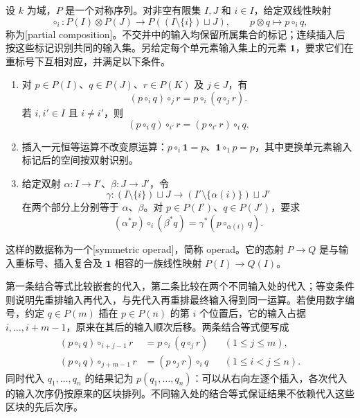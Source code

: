 \begin{definition}\label{b4:def:symmetric-operad}
	设 \(k\) 为域，\(P\) 是一个对称序列。对非空有限集 \(I,J\) 和 \(i\in I\)，给定双线性映射
	\[
		\circ_i:P(I)\otimes P(J)\longrightarrow P((I\setminus\{i\})\sqcup J),
		\qquad p\otimes q\longmapsto p\circ_i q,
	\]
	称为[partial composition]。不交并中的输入均保留所属集合的标记；连续插入后按这些标记识别共同的输入集。另给定每个单元素输入集上的元素 \(\mathbf1\)，要求它们在重标号下互相对应，并满足以下条件。
	\begin{enumerate}
		\item 对 \(p\in P(I)\)、\(q\in P(J)\)、\(r\in P(K)\) 及 \(j\in J\)，有
		\[
			(p\circ_i q)\circ_j r=p\circ_i(q\circ_j r).
		\]
		若 \(i,i'\in I\) 且 \(i\ne i'\)，则
		\[
			(p\circ_i q)\circ_{i'}r=(p\circ_{i'}r)\circ_i q.
		\]
		\item 插入一元恒等运算不改变原运算：\(p\circ_i\mathbf1=p\)、\(\mathbf1\circ_1p=p\)，其中更换单元素输入标记后的空间按双射识别。
		\item 给定双射 \(\alpha:I\rightarrow I'\)、\(\beta:J\rightarrow J'\)，令
		\[
			\gamma:(I\setminus\{i\})\sqcup J\longrightarrow (I'\setminus\{\alpha(i)\})\sqcup J'
		\]
		在两个部分上分别等于 \(\alpha\)、\(\beta\)。对 \(p\in P(I')\)、\(q\in P(J')\)，要求
		\[
			(\alpha^*p)\circ_i(\beta^*q)=\gamma^*(p\circ_{\alpha(i)}q).
		\]
	\end{enumerate}
	这样的数据称为一个[symmetric operad]，简称 operad。它的态射 \(P\rightarrow Q\) 是与输入重标号、插入复合及 \(\mathbf1\) 相容的一族线性映射 \(P(I)\rightarrow Q(I)\)。
\end{definition}

第一条结合等式比较嵌套的代入，第二条比较在两个不同输入处的代入；等变条件则说明先重排输入再代入，与先代入再重排最终输入得到同一运算。若使用数字编号，约定 \(q\in P(m)\) 插在 \(p\in P(n)\) 的第 \(i\) 个位置后，它的输入占据 \(i,\ldots,i+m-1\)，原来在其后的输入顺次后移。两条结合等式便写成
\[
	\begin{aligned}
		(p\circ_iq)\circ_{i+j-1}r&=p\circ_i(q\circ_jr) &&(1\leq j\leq m),\\
		(p\circ_iq)\circ_{j+m-1}r&=(p\circ_jr)\circ_iq &&(1\leq i<j\leq n).
	\end{aligned}
\]
同时代入 \(q_1,\ldots,q_n\) 的结果记为 \(p(q_1,\ldots,q_n)\)：可以从右向左逐个插入，各次代入的输入次序仍按原来的区块排列。不同输入处的结合等式保证结果不依赖代入这些区块的先后次序。

